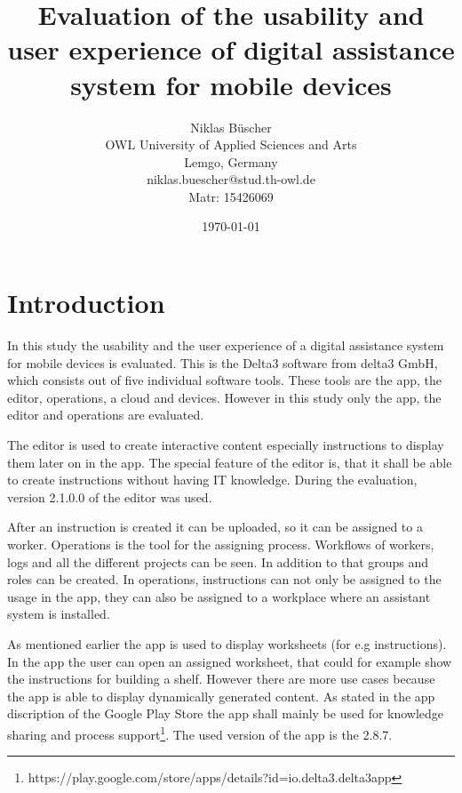 \documentclass[]{article}
\begin{document}
\begin{titlingpage}
	\title{Evaluation of the usability and user experience of digital assistance system for mobile devices}
	\author{Niklas Büscher\\
	 OWL University of Applied Sciences and Arts\\
	Lemgo, Germany \\
	niklas.buescher@stud.th-owl.de\\
	Matr: 15426069}
	\date{\today}

\end{titlingpage}

\maketitle
\newpage


\tableofcontents
\newpage

\section{Introduction}
In this study the usability and the user experience of a digital assistance system for mobile devices is evaluated. This is the Delta3 software from delta3 GmbH, which consists out of five individual software tools. These tools are the app, the editor, operations, a cloud and devices. However in this study only the app, the editor and operations are evaluated. 

\noindent The editor is used to create interactive content especially instructions to display them later on in the app. The special feature of the editor is, that it shall be able to create instructions without having IT knowledge. During the evaluation, version 2.1.0.0 of the editor was used.

\noindent After an instruction is created it can be uploaded, so it can be assigned to a worker. Operations is the tool for the assigning process. Workflows of workers, logs and all the different projects can be seen. In addition to that groups and roles can be created. In operations, instructions can not only be assigned to the usage in the app, they can also be assigned to a workplace where an assistant system is installed.

\noindent As mentioned earlier the app is used to display worksheets (for e.g instructions). In the app the user can open an assigned worksheet, that could for example show the instructions for building a shelf. However there are more use cases because the app is able to display dynamically generated content. As stated in the app discription of the Google Play Store the app shall mainly be used for knowledge sharing and process support\footnote{https://play.google.com/store/apps/details?id=io.delta3.delta3app}. The used version of the app is the 2.8.7.
\end{document}
